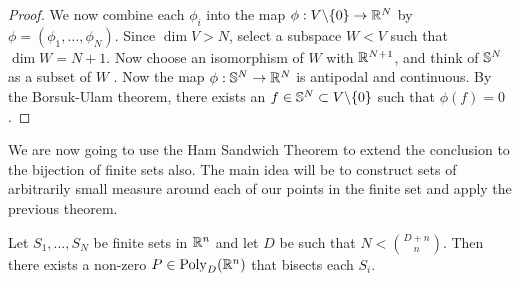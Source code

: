 \begin{proof}
We now combine each $\phi_i$ into the map $\phi : V\backslash \{0\} \to \mathbb R^N$ by $\phi = (\phi_1, \dots, \phi_N)$.
 Since $\dim V > N$, select a subspace $W < V$ such that $\dim W = N+1$. 
Now choose an isomorphism of $W$ with $\mathbb R^{N+1}$, and think of $\mathbb S^N$ as a subset of $W$ .
Now the map $\phi: \mathbb S^N \to \mathbb R^N$ is antipodal and continuous. 
By the Borsuk-Ulam theorem, there exists an $f\in \mathbb S^N \subset V\backslash \{0\}$ such that $\phi(f) = 0$.
\end{proof}
We are now going to use the Ham Sandwich Theorem to extend the conclusion to the bijection of finite sets also.
The main idea will be to construct sets of arbitrarily small measure around each of our points in the finite set and apply the previous theorem.
\begin{corollary}
    Let $S_1, \dots , S_N$ be finite sets in $\mathbb R^n$ and let $D$ be such that $N < {{D+n}\choose{n}}$. 
    Then there exists a non-zero $P\in \operatorname{Poly}_D (\mathbb R^n)$ that bisects each $S_i$.  \label{thm:FiniteHamSandwich} 
\end{corollary}

